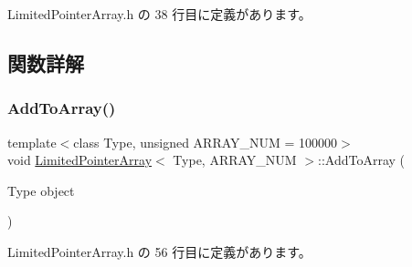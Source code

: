  Limited\+Pointer\+Array.\+h の 38 行目に定義があります。



\subsection{関数詳解}
\mbox{\label{class_limited_pointer_array_a57eb08357204668710021965425f4f46}} 
\subsubsection{\texorpdfstring{Add\+To\+Array()}{AddToArray()}}
{\footnotesize\ttfamily template$<$class Type, unsigned A\+R\+R\+A\+Y\+\_\+\+N\+UM = 100000$>$ \\
void \mbox{\hyperlink{class_limited_pointer_array}{Limited\+Pointer\+Array}}$<$ Type, A\+R\+R\+A\+Y\+\_\+\+N\+UM $>$\+::Add\+To\+Array (\begin{DoxyParamCaption}\item[{Type}]{object }\end{DoxyParamCaption})\hspace{0.3cm}{\ttfamily [inline]}}



 Limited\+Pointer\+Array.\+h の 56 行目に定義があります。


